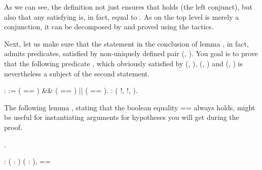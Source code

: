\begin{exercise}
\coqdocemptyline


As we can see, the definition  not just ensures that  
holds (the left conjunct), but also that any  satisfying  is,
in fact, equal to . As on the top level  is merely a
conjunction, it can be decomposed by  and proved using the
 tactics.


\begin{coqdoccode}
\coqdocemptyline
\coqdocemptyline
\end{coqdoccode}


Next, let us make sure that the statement in the conclusion of lemma
, in fact, admits predicates, satisfied by non-uniquely
defined pair (, ). You goal is to prove that the following
predicate , which obviously satisfied by (, ), (,
) and (, ) is nevertheless a subject of the second
statement.


\begin{coqdoccode}
\coqdocemptyline
\coqdocnoindent
{}    :  := \coqdoceol
\coqdocindent{1.00em}
( == ) \&\& ( == ) || ( == ).\coqdoceol
\coqdocemptyline
\coqdocnoindent
{}  : (\coqdoctac{\ensuremath{\exists}} !, \coqdoctac{\ensuremath{\exists}} !,   ).\coqdoceol
\coqdocemptyline
\coqdocemptyline
\end{coqdoccode}


\hint The following lemma , stating that the boolean equality
  ==  always holds, might be useful for instantiating arguments
 for hypotheses you will get during the proof.


\begin{coqdoccode}
\coqdocemptyline
\coqdocnoindent
{} .\coqdoceol
\coqdocemptyline
\end{coqdoccode}
\coqdoceol
\coqdocemptyline
\coqdocnoindent
{}\coqdoceol
\coqdocindent{2.50em}
: \coqdockw{\ensuremath{\forall}} ( : ) ( : ),  == 


\end{exercise}
